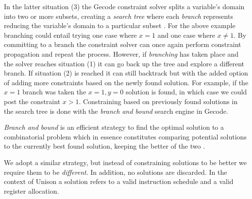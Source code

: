 In the latter situation (3) the Gecode constraint solver splits a variable's domain into
two or more subsets, creating a \textit{search tree} where each \textit{branch} represents
reducing the variable's domain to a particular subset \cite[Section~8]{MPG}. For the above
example branching could entail trying one case where $x=1$ and one case where $x\neq1$.
By committing to a branch the constraint solver can once again perform constraint
propagation and repeat the process. However, if \textit{branching} has taken place and the
solver reaches situation (1) it can go back up the tree and explore a different branch.
If situation (2) is reached it can still backtrack but with the added option of adding
more constraints based on the newly found solution. For example, if the $x=1$ branch was
taken the $x=1,y=0$ solution is found, in which case we could post the constraint $x>1$.
Constraining based on previously found solutions in the search tree is done with the
\textit{branch and bound} search engine \cite[Section~9]{MPG} in Gecode.

\textit{Branch and bound} is an efficient strategy to find the optimal solution to a
combinatorial problem which in essence constitutes comparing potential solutions to the
currently best found solution, keeping the better of the two \cite{BaB}.

We adopt a similar strategy, but instead of constraining solutions to be better we
require them to be \textit{different}. In addition, no solutions are discarded.
In the context of Unison a solution refers to a valid instruction schedule and a valid
register allocation.
